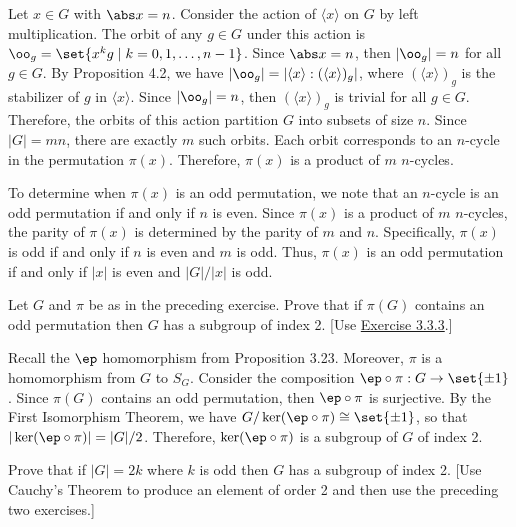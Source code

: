 \begin{sol}
	Let $x \in G$ with $\abs x = n$. Consider the action of $\langle x \rangle$ on $G$ by left multiplication. The orbit of any $g \in G$ under this action is $\oo_g = \set{x^k g \mid k = 0, 1, \ldots, n-1}$. Since $\abs x = n$, then $|\oo_g| = n$ for all $g \in G$. By Proposition 4.2, we have $|\oo_g| = |\langle x \rangle : (\langle x \rangle)_g|$, where $(\langle x \rangle)_g$ is the stabilizer of $g$ in $\langle x \rangle$. Since $|\oo_g| = n$, then $(\langle x \rangle)_g$ is trivial for all $g \in G$. Therefore, the orbits of this action partition $G$ into subsets of size $n$. Since $|G| = mn$, there are exactly $m$ such orbits. Each orbit corresponds to an $n$-cycle in the permutation $\pi(x)$. Therefore, $\pi(x)$ is a product of $m$ $n$-cycles.

	To determine when $\pi(x)$ is an odd permutation, we note that an $n$-cycle is an odd permutation if and only if $n$ is even. Since $\pi(x)$ is a product of $m$ $n$-cycles, the parity of $\pi(x)$ is determined by the parity of $m$ and $n$. Specifically, $\pi(x)$ is odd if and only if $n$ is even and $m$ is odd. Thus, $\pi(x)$ is an odd permutation if and only if $|x|$ is even and $|G|/|x|$ is odd.
\end{sol}

\newpage

\begin{exercise}
	\label{ex4.2.12} Let $G$ and $\pi$ be as in the preceding exercise. Prove that if $\pi(G)$ contains an odd permutation then $G$ has a subgroup of index 2. [Use \hyperref[ex3.3.3]{Exercise 3.3.3}.]
\end{exercise}

\begin{sol}
	Recall the $\ep$ homomorphism from Proposition 3.23. Moreover, $\pi$ is a homomorphism from $G$ to $S_G$. Consider the composition $\ep \circ \pi : G \to \set{\pm 1}$. Since $\pi(G)$ contains an odd permutation, then $\ep \circ \pi$ is surjective. By the First Isomorphism Theorem, we have $G/\ker(\ep \circ \pi) \cong \set{\pm 1}$, so that $|\ker(\ep \circ \pi)| = |G|/2$. Therefore, $\ker(\ep \circ \pi)$ is a subgroup of $G$ of index 2.
\end{sol}

\begin{exercise}
	Prove that if $|G| = 2k$ where $k$ is odd then $G$ has a subgroup of index 2. [Use Cauchy's Theorem to produce an element of order 2 and then use the preceding two exercises.]
\end{exercise}

